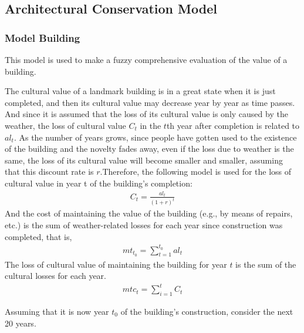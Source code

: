 \documentclass[12pt]{article}  %
\begin{document}
\subsection{Architectural Conservation Model}
\subsubsection{Model Building}
This model is used to make a fuzzy comprehensive evaluation of the value of a building.

The cultural value of a landmark building is in a great state when it is just completed, and then its cultural value may decrease year by year as time passes. And since it is assumed that the loss of its cultural value is only caused by the weather, the loss of cultural value $C_t$ in the $t$th year after completion is related to $al_t$. As the number of years grows, since people have gotten used to the existence of the building and the novelty fades away, even if the loss due to weather is the same, the loss of its cultural value will become smaller and smaller, assuming that this discount rate is $r$.Therefore, the following model is used for the loss of cultural value in year t of the building's completion:
\begin{align*}
    C_t= \frac{al_t}{(1+r)^t}
\end{align*}
And the cost of maintaining the value of the building (e.g., by means of repairs, etc.) is the sum of weather-related losses for each year since construction was completed, that is,
\begin{align*}
    mt_{t_0}= \sum\limits_{t=1}^{t_0}al_t
\end{align*}
The loss of cultural value of maintaining the building for year $t$ is the sum of the cultural losses for each year.
\begin{align*}
    mtc_{t}= \sum\limits_{i=1}^{t}C_t
\end{align*}

Assuming that it is now year $t_0$ of the building's construction, consider the next 20 years.
\end{document}
